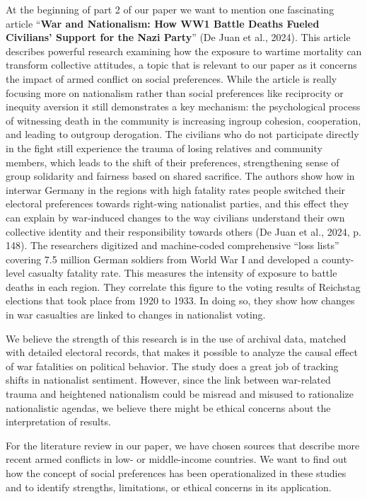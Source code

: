 \documentclass[14pt]{article}
\theoremstyle{remark}
\begin{document}
At the beginning of part 2 of our paper we want to mention one fascinating article ``\textbf{War and Nationalism: How WW1 Battle Deaths Fueled Civilians' Support for the Nazi Party}'' (De Juan et al., 2024). This article describes powerful research examining how the exposure to wartime mortality can transform collective attitudes, a topic that is relevant to our paper as it concerns the impact of armed conflict on social preferences. While the article is really focusing more on nationalism rather than social preferences like reciprocity or inequity aversion it still demonstrates a key mechanism: the psychological process of witnessing death in the community is increasing ingroup cohesion, cooperation, and leading to outgroup derogation. The civilians who do not participate directly in the fight still experience the trauma of losing relatives and community members, which leads to the shift of their preferences, strengthening sense of group solidarity and fairness based on shared sacrifice. The authors show how in interwar Germany in the regions with high fatality rates people switched their electoral preferences towards right-wing nationalist parties, and this effect they can explain by war-induced changes to the way civilians understand their own collective identity and their responsibility towards others (De Juan et al., 2024, p. 148). The researchers digitized and machine-coded comprehensive ``loss lists'' covering 7.5 million German soldiers from World War I and developed a county-level casualty fatality rate. This measures the intensity of exposure to battle deaths in each region. They correlate this figure to the voting results of Reichstag elections that took place from 1920 to 1933. In doing so, they show how changes in war casualties are linked to changes in nationalist voting.

We believe the strength of this research is in the use of archival data, matched with detailed electoral records, that makes it possible to analyze the causal effect of war fatalities on political behavior. The study does a great job of tracking shifts in nationalist sentiment. However, since the link between war-related trauma and heightened nationalism could be misread and misused to rationalize nationalistic agendas, we believe there might be ethical concerns about the interpretation of results.

For the literature review in our paper, we have chosen sources that describe more recent armed conflicts in low- or middle-income countries. We want to find out how the concept of social preferences has been operationalized in these studies and to identify strengths, limitations, or ethical concerns in its application.
\end{document}
